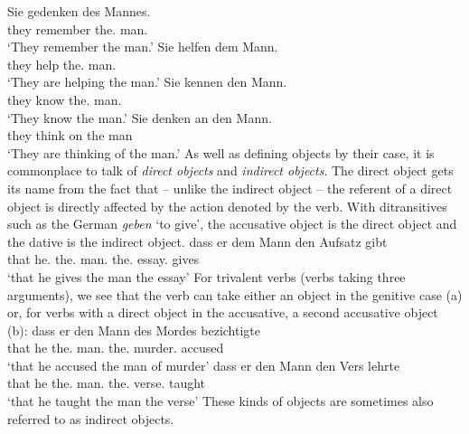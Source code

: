 \eal
\ex 
\gll Sie gedenken des Mannes.\\
	 they remember the.\gen{} man.\gen{}\\
\glt `They remember the man.'
\ex 
\gll Sie helfen dem Mann.\\
	 they help the.\dat{} man.\dat{}\\
\glt `They are helping the man.'
\ex 
\gll Sie kennen den Mann.\\
	 they know the.\acc{} man.\acc{}\\
\glt `They know the man.'
\ex 
\gll Sie denken an den Mann.\\
	 they think on the man\\
\glt `They are thinking of the man.'
\zl
As well as defining objects by their case, it is commonplace to talk of \emph{direct objects} and \emph{indirect objects}.
The direct object gets its name from the fact that -- unlike the indirect object -- the referent of a direct object is directly affected by the action denoted by the
verb.
With ditransitives such as the German \emph{geben} `to give', the accusative object is the direct object and the dative is the indirect object.
\ea
\gll dass er dem Mann den Aufsatz gibt\\
	 that he.\nom{} the.\dat{} man.\dat{} the.\acc{} essay.\acc{} gives\\
\glt `that he gives the man the essay'
\z
For trivalent verbs (verbs taking three arguments), we see that the verb can take either an object in the genitive case (a) or, for verbs with a direct object in the accusative, 
a second accusative object (b):
\eal
\ex 
\gll dass er den Mann des Mordes bezichtigte\\
	 that he the.\acc{} man.\acc{} the.\gen{} murder.\gen{} accused\\
\glt `that he accused the man of murder'
\ex 
\gll dass er den Mann den Vers lehrte\\
	 that he the.\acc{} man.\acc{} the.\acc{} verse.\acc{} taught\\
\glt `that he taught the man the verse'
\zl
These kinds of objects are sometimes also referred to as indirect objects.

